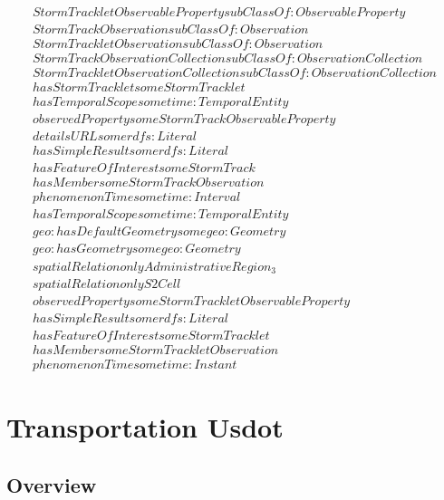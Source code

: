 \begin{align}
  StormTrackletObservableProperty subClassOf: ObservableProperty\\
  StormTrackObservation subClassOf: Observation\\
  StormTrackletObservation subClassOf: Observation\\
  StormTrackObservationCollection subClassOf: ObservationCollection\\
  StormTrackletObservationCollection subClassOf: ObservationCollection\\
  hasStormTracklet some StormTracklet \\
  hasTemporalScope some time:TemporalEntity \\
  observedProperty some StormTrackObservableProperty \\
  detailsURL some rdfs:Literal \\
  hasSimpleResult some rdfs:Literal \\
  hasFeatureOfInterest some StormTrack \\
  hasMember some StormTrackObservation \\
  phenomenonTime some time:Interval \\
  hasTemporalScope some time:TemporalEntity \\
  geo:hasDefaultGeometry some geo:Geometry \\
  geo:hasGeometry some geo:Geometry \\
  spatialRelation only AdministrativeRegion_3 \\
  spatialRelation only S2Cell \\
  observedProperty some StormTrackletObservableProperty \\
  hasSimpleResult some rdfs:Literal \\
  hasFeatureOfInterest some StormTracklet \\
  hasMember some StormTrackletObservation \\
  phenomenonTime some time:Instant \end{align}



\section{Transportation Usdot}
\label{sec:transportation-usdot}
\subsection{Overview}
\label{ssec:overview}


